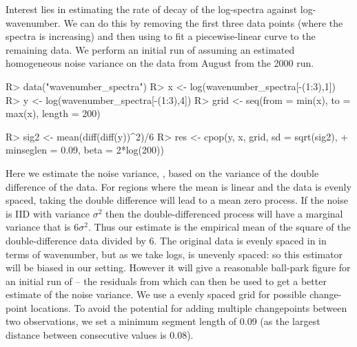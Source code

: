 \documentclass[article]{jss}
\begin{document}
Interest lies in estimating the rate of decay of the log-spectra against log-wavenumber. We can do this by removing the first three data points (where the spectra is increasing) and then using  to fit a piecewise-linear curve to the remaining data. We perform an initial run of  assuming an estimated homogeneous noise variance on the data from August from the 2000 run.
\begin{CodeChunk}
\begin{CodeInput}
R> data("wavenumber_spectra")
R> x <- log(wavenumber_spectra[-(1:3),1])
R> y <- log(wavenumber_spectra[-(1:3),4])
R> grid <- seq(from = min(x), to = max(x), length = 200)

R> sig2 <- mean(diff(diff(y))^2)/6 
R> res <- cpop(y, x, grid, sd = sqrt(sig2), 
+              minseglen = 0.09, beta = 2*log(200))
\end{CodeInput}
\end{CodeChunk}
Here we estimate the noise variance, , based on the variance of the double difference of the data. For regions where the mean is linear and the data is evenly spaced, taking the double difference will lead to a mean zero process. If the noise is IID with variance $\sigma^2$ then the double-differenced process will have a marginal variance that is $6\sigma^2$. Thus our estimate is the empirical mean of the square of the double-difference data divided by 6. The original data is evenly spaced in in terms of wavenumber, but as we take logs,  is unevenly spaced: so this estimator will be biased in our setting. However it will give a reasonable ball-park figure for an initial run of  -- the residuals from which can then be used to get a better estimate of the noise variance. We use a evenly spaced grid for possible change-point locations. To avoid the potential for adding multiple changepoints between two observations, we set a minimum segment length of 0.09 (as the largest distance between consecutive  values is 0.08).
\end{document}
